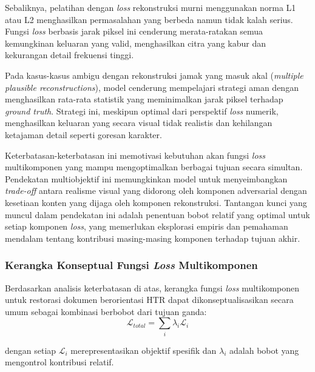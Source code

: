 \documentclass[12pt,a4paper]{article}
\begin{document}
Sebaliknya, pelatihan dengan \textit{loss} rekonstruksi murni menggunakan norma L1 atau L2 menghasilkan permasalahan yang berbeda namun tidak kalah serius. Fungsi \textit{loss} berbasis jarak piksel ini cenderung merata-ratakan semua kemungkinan keluaran yang valid, menghasilkan citra yang kabur dan kekurangan detail frekuensi tinggi.

Pada kasus-kasus ambigu dengan rekonstruksi jamak yang masuk akal (\textit{multiple plausible reconstructions}), model cenderung mempelajari strategi aman dengan menghasilkan rata-rata statistik yang meminimalkan jarak piksel terhadap \textit{ground truth}. Strategi ini, meskipun optimal dari perspektif \textit{loss} numerik, menghasilkan keluaran yang secara visual tidak realistis dan kehilangan ketajaman detail seperti goresan karakter.

Keterbatasan-keterbatasan ini memotivasi kebutuhan akan fungsi \textit{loss} multikomponen yang mampu mengoptimalkan berbagai tujuan secara simultan. Pendekatan multiobjektif ini memungkinkan model untuk menyeimbangkan \textit{trade-off} antara realisme visual yang didorong oleh komponen adversarial dengan kesetiaan konten yang dijaga oleh komponen rekonstruksi. Tantangan kunci yang muncul dalam pendekatan ini adalah penentuan bobot relatif yang optimal untuk setiap komponen \textit{loss}, yang memerlukan eksplorasi empiris dan pemahaman mendalam tentang kontribusi masing-masing komponen terhadap tujuan akhir.

\subsubsection{Kerangka Konseptual Fungsi \textit{Loss} Multikomponen}
\label{subsubsec:multi-component-loss}

Berdasarkan analisis keterbatasan di atas, kerangka fungsi \textit{loss} multikomponen untuk restorasi dokumen berorientasi HTR dapat dikonseptualisasikan secara umum sebagai kombinasi berbobot dari tujuan ganda:
\begin{equation}
      \mathcal{L}_{total} = \sum_{i} \lambda_i \mathcal{L}_i
\end{equation}

dengan setiap $\mathcal{L}_i$ merepresentasikan objektif spesifik dan $\lambda_i$ adalah bobot yang mengontrol kontribusi relatif.
\end{document}
